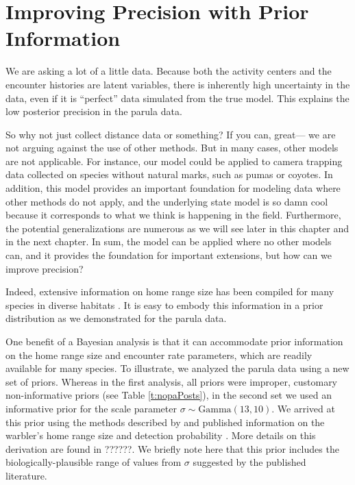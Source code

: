 \section{Improving Precision with Prior Information}
\label{Sect.precision}

We are asking a lot of a little data. Because both the activity
centers and the encounter histories are latent variables, there is
inherently high uncertainty in the data, even if it is ``perfect''
data simulated from the true model. This explains the low posterior
precision in the parula data.

So why not just collect distance data or something? If you can, great---
we are not arguing against the use of other methods. But in many
cases, other models are not applicable. For instance, our model could
be applied to camera trapping data collected on species without
natural marks, such as pumas or coyotes. In addition, this
model provides an important foundation for modeling data where other
methods do not apply, and the underlying state model is so damn cool
because it corresponds to what we think is happening in the field.
Furthermore, the potential generalizations are numerous as we
will see later in this chapter and in the next chapter. In sum, the
model can be applied where no other models can, and it provides the
foundation for important extensions, but how can we improve precision?

Indeed, extensive information on home range size has
been compiled for many species in diverse habitats %
\citep[\emph{e.g.},][]{degraaf_yamasaki:2001}. It is
easy to embody this information in a prior distribution as we
demonstrated for the parula data.


One benefit of a Bayesian analysis is that it can accommodate prior
information on the home range size and encounter rate parameters,
which are readily available for many
species. To illustrate, we analyzed the parula data using a new set of
priors. Whereas in the first analysis, all priors were
improper, customary non-informative priors (see Table \ref{t:nopaPosts}),
in the second set we used
an informative prior for the scale parameter $\sigma \sim
\mbox{Gamma}(13,10)$. We arrived at this prior using the methods
described by \citet{royle_etal:2011mee} and published
information on the warbler's home range size and detection probability
\citep{moldenhaer_regelski:1996,simons_etal:2009}. More details on this
derivation are found in ??????. We briefly note here that this prior
includes the biologically-plausible range of values from $\sigma$
suggested by the published literature.


